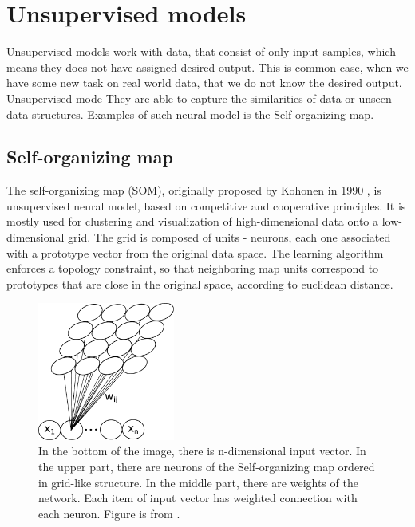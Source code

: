 \section{Unsupervised models}

Unsupervised models work with data, that consist of only input samples, which means they does not have assigned desired output. This is common case, when we have some new task on real world data, that we do not know the desired output. Unsupervised mode
They are able to capture the similarities of data or unseen data structures. Examples of such neural model is the Self-organizing map.

\subsection{Self-organizing map}
\label{sec:som}

The self-organizing map (SOM), originally proposed by Kohonen in 1990 \cite{kohonen1990}, is unsupervised neural model, based on competitive and cooperative principles. It is mostly used for clustering and visualization of high-dimensional data onto a low-dimensional grid. The grid is composed of units - neurons, each one associated with a prototype vector from the original data space. The learning algorithm enforces a topology constraint, so that neighboring map units correspond to prototypes that are close in the original space, according to euclidean distance. \cite{desom2019} 

\begin{figure}[h!]
    \centering
    \includegraphics[width=0.4\textwidth]{figs/som.pdf}
    \caption[Self-organizing map]{In the bottom of the image, there is n-dimensional input vector. In the upper part, there are neurons of the Self-organizing map ordered in grid-like structure. In the middle part, there are weights of the network. Each item of input vector has weighted connection with each neuron. Figure is from \cite{rebrova2013}.}
    \label{fig:som}
\end{figure}

